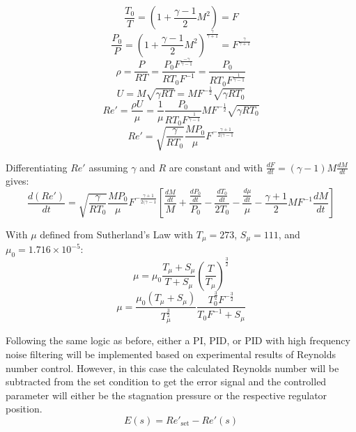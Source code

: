 \begin{equation}
    \frac{T_0}{T} = (1+\frac{\gamma-1}{2}M^2) = F
\end{equation}
\begin{equation}
    \frac{P_0}{P} = (1+\frac{\gamma-1}{2}M^2)^{\frac{\gamma}{\gamma+1}} = F^{\frac{\gamma}{\gamma+1}}
\end{equation}
\begin{equation}
    \rho = \frac{P}{R T} = \frac{P_0 F^{\frac{-\gamma}{\gamma-1}}}{R T_0 F^{-1}} = \frac{P_0}{R T_0 F^{\frac{1}{\gamma-1}}}
\end{equation}
\begin{equation}
    U = M \sqrt{\gamma R T} = M F^{-\frac{1}{2}} \sqrt{\gamma R T_0}
\end{equation}
\begin{equation*}
    Re' = \frac{\rho U}{\mu} = \frac{1}{\mu} \frac{P_0}{R T_0 F^{\frac{1}{\gamma-1}}} M F^{-\frac{1}{2}} \sqrt{\gamma R T_0}
\end{equation*}
\begin{equation}
    Re' = \sqrt{\frac{\gamma}{R T_0}} \frac{M P_0}{\mu} F^{-\frac{\gamma+1}{2(\gamma -1}}
\end{equation}


\noindent Differentiating $Re'$ assuming $\gamma$ and $R$ are constant and with $\frac{dF}{dt} = (\gamma-1)M \frac{dM}{dt}$ gives:
\begin{equation}
    \frac{d(Re')}{dt} = \sqrt{\frac{\gamma}{R T_0}} \frac{M P_0}{\mu} F^{-\frac{\gamma+1}{2(\gamma -1}} \left[ \frac{\frac{dM}{dt}}{M} + \frac{\frac{dP_0}{dt}}{P_0} - \frac{\frac{dT_0}{dt}}{2T_0} - \frac{\frac{d\mu}{dt}}{\mu} - \frac{\gamma+1}{2} M F^{-1} \frac{dM}{dt} \right]
\end{equation}

\noindent With $\mu$ defined from Sutherland's Law with $T_\mu = 273$, $S_\mu = 111$, and $\mu_0 = 1.716 \times 10^{-5}$:
\begin{equation}
    \mu = \mu_0 \frac{T_\mu+S_\mu}{T+S_\mu} \left( \frac{T}{T_\mu} \right)^{\frac{3}{2}}
\end{equation}
\begin{equation}
    \mu = \frac{\mu_0(T_\mu+S_\mu)}{T_\mu^{\frac{3}{2}}} \frac{T_0^{\frac{3}{2}} F^{-\frac{3}{2}}}{T_0 F^{-1}+S_\mu}
\end{equation}

Following the same logic as before, either a PI, PID, or PID with high frequency noise filtering will be implemented based on experimental results of Reynolds number control. However, in this case the calculated Reynolds number will be subtracted from the set condition to get the error signal and the controlled parameter will either be the stagnation pressure or the respective regulator position.
\begin{equation}
    E(s) = Re'_{\mathrm{set}} - Re'(s)
\end{equation}

